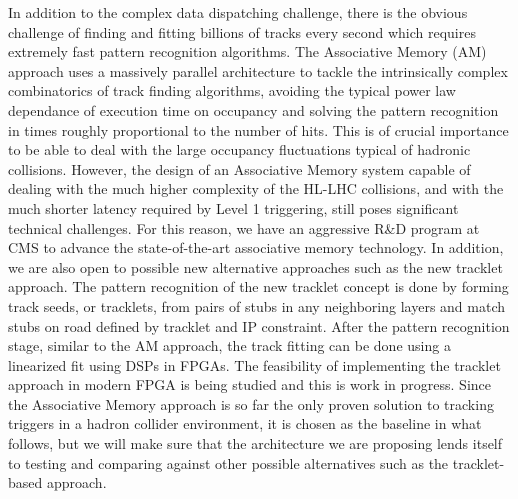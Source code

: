 	In addition to the complex data dispatching challenge, there is the obvious challenge of finding and fitting billions of tracks every second which requires extremely fast pattern recognition algorithms. The Associative Memory (AM) approach uses a massively parallel architecture to tackle the intrinsically complex combinatorics of track finding algorithms, avoiding the typical power law dependance of execution time on occupancy and solving the pattern recognition in times roughly proportional to the number of hits. This is of crucial importance to be able to deal with the large occupancy fluctuations typical of hadronic collisions. However, the design of an Associative Memory system capable of dealing with the much higher complexity of the HL-LHC collisions, and with the much shorter latency required by Level 1 triggering, still poses significant technical challenges. For this reason, we have an aggressive R\&D program at CMS to advance the state-of-the-art associative memory technology. In addition, we are also open to possible new alternative approaches such as the new tracklet approach. The pattern recognition of the new tracklet concept is done by forming track seeds, or tracklets, from pairs of stubs in any neighboring layers and match stubs on road defined by tracklet and IP constraint. After the pattern recognition stage, similar to the AM approach, the track fitting can be done using a linearized fit using DSPs in FPGAs. The feasibility of implementing the tracklet approach in modern FPGA is being studied and this is work in progress. Since the Associative Memory approach is so far the only proven solution to tracking triggers in a hadron collider environment, it is chosen  as the baseline in what follows, but we will make sure that the architecture we are proposing lends itself to testing and comparing against other possible alternatives such as the tracklet-based approach.

